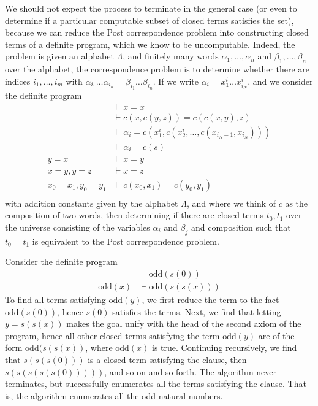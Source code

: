 \begin{example}
We should not expect the process to terminate in the general case (or even to determine if a particular computable subset of closed terms satisfies the set), because we can reduce the Post correspondence problem into constructing closed terms of a definite program, which we know to be uncomputable. Indeed, the problem is given an alphabet $\Lambda$, and finitely many words $\alpha_1, \dots, \alpha_n$ and $\beta_1, \dots, \beta_n$ over the alphabet, the correspondence problem is to determine whether there are indices $i_1, \dots, i_m$ with $\alpha_{i_1} \dots \alpha_{i_n} = \beta_{i_1} \dots \beta_{i_n}$. If we write $\alpha_i = x_1^i \dots x_{i_N}^i$, and we consider the definite program
%
\begin{align*}
    &\vdash x = x\\
    &\vdash c(x,c(y,z)) = c(c(x,y),z)\\
    &\vdash \alpha_i = c(x_1^i, c(x_2^i, \dots, c(x_{i_N-1}, x_{i_N})))\\
    &\vdash \alpha_i = c(s)\\
    y = x &\vdash x = y\\
    x = y, y = z &\vdash x = z\\
    x_0 = x_1, y_0 = y_1 &\vdash c(x_0,x_1) = c(y_0,y_1)\\
\end{align*}
%
with addition constants given by the alphabet $\Lambda$, and where we think of $c$ as the composition of two words, then determining if there are closed terms $t_0,t_1$ over the universe consisting of the variables $\alpha_i$ and $\beta_j$ and composition such that $t_0 = t_1$ is equivalent to the Post correspondence problem.
\end{example}

\begin{example}
    Consider the definite program
    \begin{align*}
        &\vdash \text{odd}(s(0))\\
        \text{odd}(x) &\vdash \text{odd}(s(s(x)))
    \end{align*}
    To find all terms satisfying $\text{odd}(y)$, we first reduce the term to the fact $\text{odd}(s(0))$, hence $s(0)$ satisfies the terms. Next, we find that letting $y = s(s(x))$ makes the goal unify with the head of the second axiom of the program, hence all other closed terms satisfying the term $\text{odd}(y)$ are of the form $\text{odd}(s(s(x))$, where $\text{odd}(x)$ is true. Continuing recursively, we find that $s(s(s(0)))$ is a closed term satisfying the clause, then $s(s(s(s(s(0)))))$, and so on and so forth. The algorithm never terminates, but successfully enumerates all the terms satisfying the clause. That is, the algorithm enumerates all the odd natural numbers.
\end{example}

